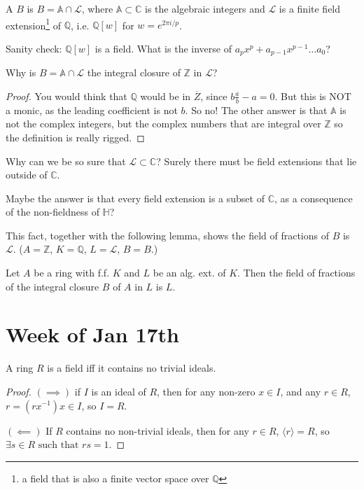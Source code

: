 \begin{definition}
A  $B$ is $B=\mathbb{A}\cap \mathcal{L}$, where $\mathbb{A}\subset \mathbb{C}$ is the algebraic integers and $\mathcal{L}$ is a finite field extension\footnote{a field that is also a finite vector space over $\mathbb{Q}$} of $\mathbb{Q}$, i.e. $\mathbb{Q}[w]$ for $w=e^{2\pi i/p}$.
\end{definition}

Sanity check: $\mathbb{Q}[w]$ is a field. What is the inverse of $a_px^p+a_{p-1}x^{p-1}\dots a_0$?

\begin{question}
Why is $B=\mathbb{A}\cap \mathcal{L}$ the integral closure of $\mathbb{Z}$ in $\mathcal{L}$?
\end{question}
\begin{proof}
You would think that $\mathbb{Q}$ would be in $\overline{Z}$, since $b\frac{a}{b}-a=0$. But this is NOT a monic, as the leading coefficient is not $b$. So no! The other answer is that $\mathbb{A}$ is not the complex integers, but the complex numbers that are integral over $\mathbb{Z}$ so the definition is really rigged.
\end{proof}

\begin{question}
Why can we be so sure that $\mathcal{L}\subset \mathbb{C}$? Surely there must be field extensions that lie outside of $\mathbb{C}$.
\end{question}
Maybe the answer is that every field extension is a subset of $\mathbb{C}$, as a consequence of the non-fieldness of $\mathbb{H}$?

This fact, together with the following lemma, shows the field of fractions of $B$ is $\mathcal{L}$. ($A=\mathbb{Z}$, $K=\mathbb{Q}$, $L=\mathcal{L}$, $B=B$.)
\begin{lemma}
Let $A$ be a ring with f.f. $K$ and $L$ be an alg. ext. of $K$. Then the field of fractions of the integral closure $B$ of $A$ in $L$ is $L$.
\end{lemma}

\section{Week of Jan 17th}

\begin{lemma}
A ring $R$ is a field iff it contains no trivial ideals.
\end{lemma}
\begin{proof}
$(\implies)$ if $I$ is an ideal of $R$, then for any non-zero $x\in I$, and any $r\in R$, $r=(rx^{-1})x\in I$, so $I=R$.

$(\impliedby)$ If $R$ contains no non-trivial ideals, then for any $r\in R$, $\langle r\rangle =R$, so $\exists s\in R \text{ such that } rs=1$.
\end{proof}

